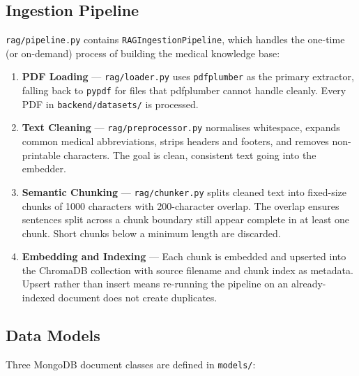 \subsection{Ingestion Pipeline}
\label{sec:ingestion}

\texttt{rag/pipeline.py} contains \texttt{RAGIngestionPipeline}, which handles the
one-time (or on-demand) process of building the medical knowledge base:

\begin{enumerate}
  \item \textbf{PDF Loading} --- \texttt{rag/loader.py} uses \texttt{pdfplumber} as the
        primary extractor, falling back to \texttt{pypdf} for files that pdfplumber
        cannot handle cleanly. Every PDF in \texttt{backend/datasets/} is processed.

  \item \textbf{Text Cleaning} --- \texttt{rag/preprocessor.py} normalises whitespace,
        expands common medical abbreviations, strips headers and footers, and removes
        non-printable characters. The goal is clean, consistent text going into the
        embedder.

  \item \textbf{Semantic Chunking} --- \texttt{rag/chunker.py} splits cleaned text into
        fixed-size chunks of 1000 characters with 200-character overlap. The overlap
        ensures sentences split across a chunk boundary still appear complete in at
        least one chunk. Short chunks below a minimum length are discarded.

  \item \textbf{Embedding and Indexing} --- Each chunk is embedded and upserted into
        the ChromaDB collection with source filename and chunk index as metadata.
        Upsert rather than insert means re-running the pipeline on an already-indexed
        document does not create duplicates.
\end{enumerate}

\subsection{Data Models}
\label{sec:models}

Three MongoDB document classes are defined in \texttt{models/}:

